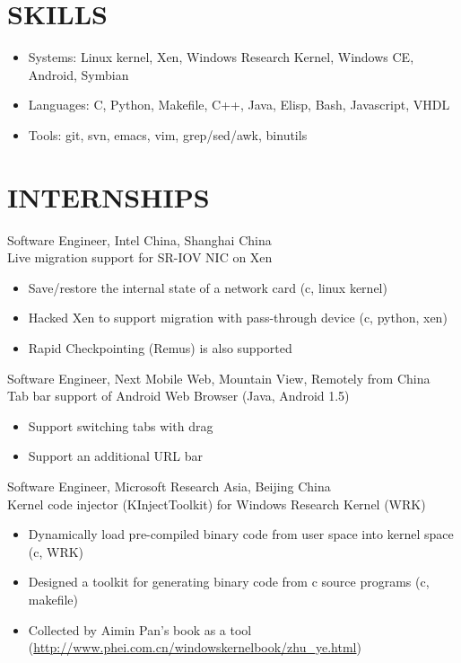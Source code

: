 \documentclass[11pt]{res} %
\begin{document}
\begin{resume}

\section{SKILLS}

\begin{itemize} \itemsep -2pt
\item Systems: Linux kernel, Xen, Windows Research Kernel, Windows CE, Android, Symbian
\item Languages: C, Python, Makefile, C++, Java, Elisp, Bash, Javascript, VHDL
\item Tools: git, svn, emacs, vim, grep/sed/awk, binutils
\end{itemize} 

\section{INTERNSHIPS}
Software Engineer, Intel China, Shanghai China \\
Live migration support for SR-IOV NIC on Xen

\begin{itemize} \itemsep -2pt
\item Save/restore the internal state of a network card (c, linux kernel)
\item Hacked Xen to support migration with pass-through device (c, python, xen)
\item Rapid Checkpointing (Remus) is also supported
\end{itemize} 

Software Engineer, Next Mobile Web, Mountain View, Remotely from China \\
Tab bar support of Android Web Browser (Java, Android 1.5)

\begin{itemize} \itemsep -2pt
\item Support switching tabs with drag
\item Support an additional URL bar
\end{itemize} 

Software Engineer, Microsoft Research Asia, Beijing China \\
Kernel code injector (KInjectToolkit) for Windows Research Kernel (WRK)

\begin{itemize} \itemsep -2pt
\item Dynamically load pre-compiled binary code from user space into kernel space (c, WRK)
\item Designed a toolkit for generating binary code from c source programs (c, makefile)
\item Collected by Aimin Pan's book as a tool
  (\href{http://www.phei.com.cn/windowskernelbook/zhu\_ye.html}{http://www.phei.com.cn/windowskernelbook/zhu\_ye.html})
\end{itemize} 


\end{resume}
\end{document}

